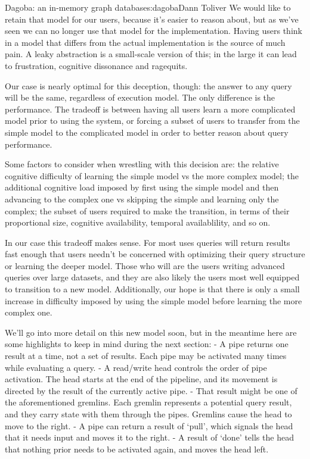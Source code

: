 \begin{aosachapter}{Dagoba: an in-memory graph database}{s:dagoba}{Dann Toliver}
We would like to retain that model for our users, because it's easier to
reason about, but as we've seen we can no longer use that model for the
implementation. Having users think in a model that differs from the
actual implementation is the source of much pain. A leaky abstraction is
a small-scale version of this; in the large it can lead to frustration,
cognitive dissonance and ragequits.

Our case is nearly optimal for this deception, though: the answer to any
query will be the same, regardless of execution model. The only
difference is the performance. The tradeoff is between having all users
learn a more complicated model prior to using the system, or forcing a
subset of users to transfer from the simple model to the complicated
model in order to better reason about query performance.

Some factors to consider when wrestling with this decision are: the
relative cognitive difficulty of learning the simple model vs the more
complex model; the additional cognitive load imposed by first using the
simple model and then advancing to the complex one vs skipping the
simple and learning only the complex; the subset of users required to
make the transition, in terms of their proportional size, cognitive
availability, temporal availablility, and so on.

In our case this tradeoff makes sense. For most uses queries will return
results fast enough that users needn't be concerned with optimizing
their query structure or learning the deeper model. Those who will are
the users writing advanced queries over large datasets, and they are
also likely the users most well equipped to transition to a new model.
Additionally, our hope is that there is only a small increase in
difficulty imposed by using the simple model before learning the more
complex one.

We'll go into more detail on this new model soon, but in the meantime
here are some highlights to keep in mind during the next section: - A
pipe returns one result at a time, not a set of results. Each pipe may
be activated many times while evaluating a query. - A read/write head
controls the order of pipe activation. The head starts at the end of the
pipeline, and its movement is directed by the result of the currently
active pipe. - That result might be one of the aforementioned gremlins.
Each gremlin represents a potential query result, and they carry state
with them through the pipes. Gremlins cause the head to move to the
right. - A pipe can return a result of `pull', which signals the head
that it needs input and moves it to the right. - A result of `done'
tells the head that nothing prior needs to be activated again, and moves
the head left.


\end{aosachapter}
